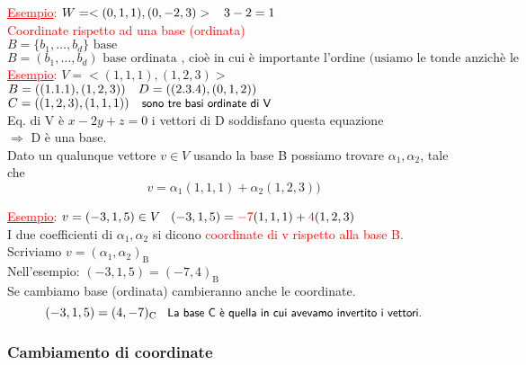 \textcolor{red}{\underline{Esempio}:} $W = <(0,1,1),(0,-2,3)> \hspace{0.3cm} 3 - 2 = 1$\\

\textcolor{red}{Coordinate rispetto ad una base (ordinata)}\\
$B = \{ b_1, \dots, b_d\} \text{ base}$\\
$B = (b_1, \dots, b_d) \text{ base ordinata , cioè in cui è importante l'ordine (usiamo le tonde anzichè le graffe)}$\\

\textcolor{red}{\underline{Esempio}:} $V = <(1,1,1),(1,2,3)>$\\
$B = \left( (1.1.1),(1,2,3) \right) \hspace{0.3cm} D =\left( (2.3.4),(0,1,2) \right)$\\
$C = \left( (1,2,3),(1,1,1)\right) \hspace{0.3cm} \textsf{\small sono tre basi ordinate di V}$\\
\textsf{\small Eq. di V è $x - 2y + z = 0$ i vettori di D soddisfano questa equazione}\\
$\Rightarrow$ \textsf{\small D è una base.}\\
\textsf{\small Dato un qualunque vettore $v \in V$ usando la base B possiamo trovare $\alpha_1, \alpha_2$, tale che }
\[
v = \alpha_1(1,1,1) + \alpha_2(1,2,3))
\]

\textcolor{red}{\underline{Esempio}:} $v = (-3, 1, 5) \in V \hspace{0.3cm} (-3,1,5) = \textcolor{red}{-7}(1,1,1) + \textcolor{red}{4}(1,2,3)$\\

\textsf{\small I due coefficienti di $\alpha_1,\alpha_2$ si dicono \textcolor{red}{coordinate di v rispetto alla base B.}}\\
\textsf{\small Scriviamo $v = (\alpha_1, \alpha_2)_\text{B}$}\\
\textsf{\small Nell'esempio: $(-3,1,5) = (-7,4)_\text{B}$}\\
\textsf{\small Se cambiamo base (ordinata) cambieranno anche le coordinate.}
\[
(-3,1,5) = (4,-7)_\text{C} \hspace{0.3cm} \textsf{\small La base C è quella in cui avevamo invertito i vettori.}
\]

\subsubsection{Cambiamento di coordinate}

